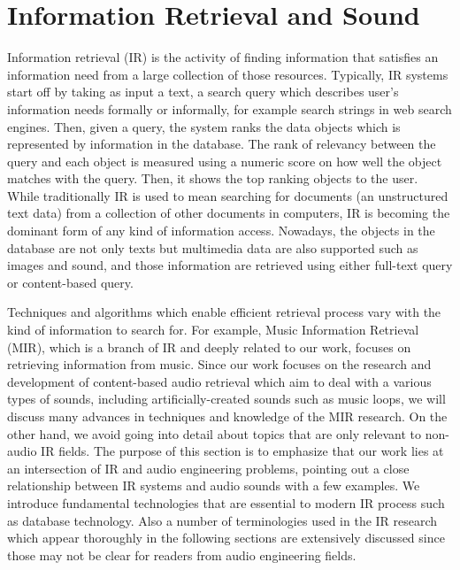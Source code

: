 \section{Information Retrieval and Sound}
Information retrieval (IR) is the activity of finding information that satisfies an information need from a large collection of those resources. Typically, IR systems start off by taking as input a text, a search query which describes user's information needs formally or informally, for example search strings in web search engines. Then, given a query, the system ranks the data objects which is represented by information in the database. The rank of relevancy between the query and each object is measured using a numeric score on how well the object matches with the query. Then, it shows the top ranking objects to the user. While traditionally IR is used to mean searching for documents (an unstructured text data) from a collection of other documents in computers, IR is becoming the dominant form of any kind of information access. Nowadays, the objects in the database are not only texts but multimedia data are also supported such as images and sound, and those information are retrieved using either full-text query or content-based query.

Techniques and algorithms which enable efficient retrieval process vary with the kind of information to search for. For example, Music Information Retrieval (MIR), which is a branch of IR and deeply related to our work, focuses on retrieving information from music. Since our work focuses on the research and development of content-based audio retrieval which aim to deal with a various types of sounds, including artificially-created sounds such as music loops, we will discuss many advances in techniques and knowledge of the MIR research. On the other hand, we avoid going into detail about topics that are only relevant to non-audio IR fields. The purpose of this section is to emphasize that our work lies at an intersection of IR and audio engineering problems, pointing out a close relationship between IR systems and audio sounds with a few examples. We introduce fundamental technologies that are essential to modern IR process such as database technology. Also a number of terminologies used in the IR research which appear thoroughly in the following sections are extensively discussed since those may not be clear for readers from audio engineering fields.

